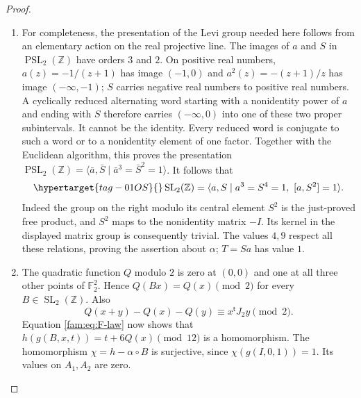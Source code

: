\begin{proof}
\begin{enumerate}[label=\arabic*.,leftmargin=*]
\item For completeness, the presentation of the Levi group needed here follows
from an elementary action on the real projective line.  The images of $a$
and $S$ in $\operatorname{PSL}_2(\mathbb Z)$ have orders $3$ and $2$.
On positive real numbers, $a(z)=-1/(z+1)$ has image $(-1,0)$ and
$a^2(z)=-(z+1)/z$ has image $(-\infty,-1)$; $S$ carries negative real
numbers to positive real numbers.  A cyclically reduced alternating word
starting with a nonidentity power of $a$ and ending with $S$ therefore
carries $(-\infty,0)$ into one of these two proper subintervals.  It cannot
be the identity.  Every reduced word is conjugate to such a word or to a
nonidentity element of one factor.  Together with the Euclidean algorithm,
this proves the presentation
$\operatorname{PSL}_2(\mathbb Z)=\langle\bar a,\bar S\mid
\bar a^3=\bar S^2=1\rangle$.  It follows that
\begin{equation}\hypertarget{tag-01OS}{}\label{fam:eq:F-SLpresentation}
 \operatorname{SL}_2(\mathbb Z)=
 \langle a,S\mid a^3=S^4=1,\ [a,S^2]=1\rangle.
\end{equation}
Indeed the group on the right modulo its central element $S^2$ is the
just-proved free product, and $S^2$ maps to the nonidentity matrix $-I$.
Its kernel in the displayed matrix group is consequently trivial.
The values $4,9$ respect all these relations, proving the assertion about
$\alpha$; $T=Sa$ has value $1$.

\item The quadratic function $Q$ modulo $2$ is zero at $(0,0)$ and one at all
three other points of $\mathbb F_2^2$.  Hence $Q(Bx)=Q(x)\pmod2$ for every
$B\in\operatorname{SL}_2(\mathbb Z)$.  Also
\[
 Q(x+y)-Q(x)-Q(y)\equiv x^{\mathsf t}J_2y\pmod2.
\]
Equation \eqref{fam:eq:F-law} now shows that
$h(g(B,x,t))=t+6Q(x)\pmod{12}$ is a homomorphism.
The homomorphism $\chi=h-\alpha\circ B$ is surjective, since
$\chi(g(I,0,1))=1$.  Its values on $A_1,A_2$ are zero.


\end{enumerate}
\end{proof}

